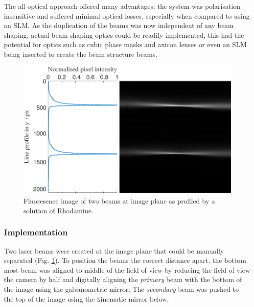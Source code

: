 The all optical approach offered many advantages: the system was polarisation insensitive and suffered minimal optical losses, especially when compared to using an SLM.
As the duplication of the beams was now independent of any beam shaping, actual beam shaping optics could be readily implemented, this had the potential for optics such as cubic phase masks and axicon lenses or even an SLM being inserted to create the beam structure beams.

\begin{figure}
  \centering
  \includegraphics{dual_beam_profile}
  \caption{Fluoresence image of two beams at image plane as profiled by a solution of Rhodamine.}
  \label{fig:real_dual_beams}
\end{figure}

\subsubsection{Implementation}

Two laser beams were created at the image plane that could be manually separated (Fig. \ref{fig:real_dual_beams}).
To position the beams the correct distance apart, the bottom most beam was aligned to middle of the field of view by reducing the field of view the camera by half and digitally aligning the \emph{primary} beam with the bottom of the image using the galvanometric mirror.
The \emph{secondary} beam was pushed to the top of the image using the kinematic mirror below.

